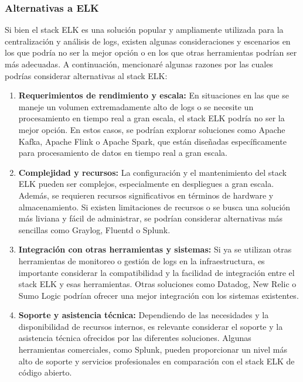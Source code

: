 \subsubsection{Alternativas a ELK}

Si bien el stack ELK es una solución popular y ampliamente utilizada para la centralización y análisis de logs, existen algunas consideraciones y escenarios en los que podría no ser la mejor opción o en los que otras herramientas podrían ser más adecuadas. A continuación, mencionaré algunas razones por las cuales podrías considerar alternativas al stack ELK:


\begin{enumerate}
\item \textbf{Requerimientos de rendimiento y escala:} En situaciones en las que se maneje un volumen extremadamente alto de logs o se necesite un procesamiento en tiempo real a gran escala, el stack ELK podría no ser la mejor opción. En estos casos, se podrían explorar soluciones como Apache Kafka, Apache Flink o Apache Spark, que están diseñadas específicamente para procesamiento de datos en tiempo real a gran escala.

\item \textbf{Complejidad y recursos:} La configuración y el mantenimiento del stack ELK pueden ser complejos, especialmente en despliegues a gran escala. Además, se requieren recursos significativos en términos de hardware y almacenamiento. Si existen limitaciones de recursos o se busca una solución más liviana y fácil de administrar, se podrían considerar alternativas más sencillas como Graylog, Fluentd o Splunk.

\item \textbf{Integración con otras herramientas y sistemas:} Si ya se utilizan otras herramientas de monitoreo o gestión de logs en la infraestructura, es importante considerar la compatibilidad y la facilidad de integración entre el stack ELK y esas herramientas. Otras soluciones como Datadog, New Relic o Sumo Logic podrían ofrecer una mejor integración con los sistemas existentes.

\item \textbf{Soporte y asistencia técnica:} Dependiendo de las necesidades y la disponibilidad de recursos internos, es relevante considerar el soporte y la asistencia técnica ofrecidos por las diferentes soluciones. Algunas herramientas comerciales, como Splunk, pueden proporcionar un nivel más alto de soporte y servicios profesionales en comparación con el stack ELK de código abierto.


\end{enumerate}
